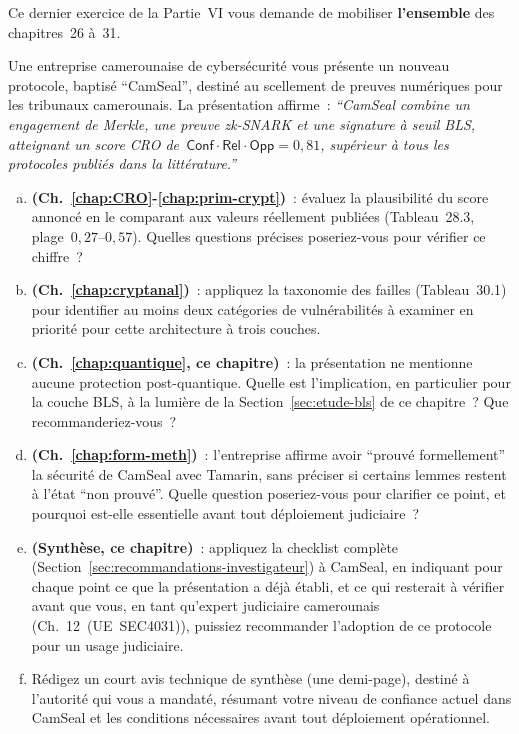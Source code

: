 \begin{boxexo}[title={\ding{45}\quad Exercice~32.3. Synthèse intégrale de la Partie~VI \niveauexpert}]
Ce dernier exercice de la Partie~VI vous demande de mobiliser
\textbf{l'ensemble} des chapitres~26 à~31.

Une entreprise camerounaise de cybersécurité vous présente un
nouveau protocole, baptisé ``CamSeal'', destiné au scellement de
preuves numériques pour les tribunaux camerounais. La présentation
affirme~: \textit{``CamSeal combine un engagement de Merkle, une
preuve zk-SNARK et une signature à seuil BLS, atteignant un score
CRO de~$\mathsf{Conf}\cdot\mathsf{Rel}\cdot\mathsf{Opp} = 0{,}81$,
supérieur à tous les protocoles publiés dans la littérature.''}

\begin{enumerate}[(a)]
    \item \textbf{(Ch.~\ref{chap:CRO}-\ref{chap:prim-crypt})}~:
          évaluez la plausibilité du score annoncé en le comparant
          aux valeurs réellement publiées (Tableau~28.3,
          plage~$0{,}27$--$0{,}57$). Quelles questions précises
          poseriez-vous pour vérifier ce chiffre~?
    \item \textbf{(Ch.~\ref{chap:cryptanal})}~: appliquez la
          taxonomie des failles (Tableau~30.1) pour identifier au
          moins deux catégories de vulnérabilités à examiner en
          priorité pour cette architecture à trois couches.
    \item \textbf{(Ch.~\ref{chap:quantique}, ce chapitre)}~: la
          présentation ne mentionne aucune protection
          post-quantique. Quelle est l'implication, en particulier
          pour la couche BLS, à la lumière de la
          Section~\ref{sec:etude-bls} de ce chapitre~? Que
          recommanderiez-vous~?
    \item \textbf{(Ch.~\ref{chap:form-meth})}~: l'entreprise
          affirme avoir ``prouvé formellement'' la sécurité de
          CamSeal avec Tamarin, sans préciser si certains lemmes
          restent à l'état ``non prouvé''. Quelle question
          poseriez-vous pour clarifier ce point, et pourquoi
          est-elle essentielle avant tout déploiement judiciaire~?
    \item \textbf{(Synthèse, ce chapitre)}~: appliquez la checklist
          complète (Section~\ref{sec:recommandations-investigateur})
          à CamSeal, en indiquant pour chaque point ce que la
          présentation a déjà établi, et ce qui resterait à
          vérifier avant que vous, en tant qu'expert judiciaire
          camerounais (Ch.~12~(UE~SEC4031)), puissiez
          recommander l'adoption de ce protocole pour un usage
          judiciaire.
    \item Rédigez un court avis technique de synthèse (une demi-page),
          destiné à l'autorité qui vous a mandaté, résumant votre
          niveau de confiance actuel dans CamSeal et les conditions
          nécessaires avant tout déploiement opérationnel.
\end{enumerate}
\end{boxexo}

